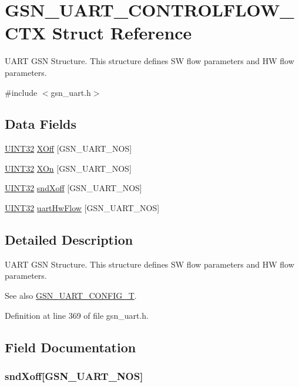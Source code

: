 \hypertarget{a00264}{
\section{GSN\_\-UART\_\-CONTROLFLOW\_\-CTX Struct Reference}
\label{a00264}
}


UART GSN Structure. This structure defines SW flow parameters and HW flow parameters.  




{\ttfamily \#include $<$gsn\_\-uart.h$>$}

\subsection*{Data Fields}
\begin{DoxyCompactItemize}
\item 
\hyperlink{a00660_gae1e6edbbc26d6fbc71a90190d0266018}{UINT32} \hyperlink{a00264_a6923b1711832ca57f94d65ee00851907}{XOff} \mbox{[}GSN\_\-UART\_\-NOS\mbox{]}
\item 
\hyperlink{a00660_gae1e6edbbc26d6fbc71a90190d0266018}{UINT32} \hyperlink{a00264_a20339b5ed2ceeb35592446e561d1f642}{XOn} \mbox{[}GSN\_\-UART\_\-NOS\mbox{]}
\item 
\hyperlink{a00660_gae1e6edbbc26d6fbc71a90190d0266018}{UINT32} \hyperlink{a00264_a8b105fde305b313e4203c354a0bfff28}{sndXoff} \mbox{[}GSN\_\-UART\_\-NOS\mbox{]}
\item 
\hyperlink{a00660_gae1e6edbbc26d6fbc71a90190d0266018}{UINT32} \hyperlink{a00264_a6a20be3b2209f1ff645260a6a36910c1}{uartHwFlow} \mbox{[}GSN\_\-UART\_\-NOS\mbox{]}
\end{DoxyCompactItemize}


\subsection{Detailed Description}
UART GSN Structure. This structure defines SW flow parameters and HW flow parameters. 

\begin{DoxySeeAlso}{See also}
\hyperlink{a00656_gab793201a4cc37e8cf27b0b640b1f37bc}{GSN\_\-UART\_\-CONFIG\_\-T}. 
\end{DoxySeeAlso}


Definition at line 369 of file gsn\_\-uart.h.



\subsection{Field Documentation}
\hypertarget{a00264_a8b105fde305b313e4203c354a0bfff28}{
\subsubsection[{sndXoff}]{ {\bf sndXoff}\mbox{[}GSN\_\-UART\_\-NOS\mbox{]}}}
\label{a00264_a8b105fde305b313e4203c354a0bfff28}


